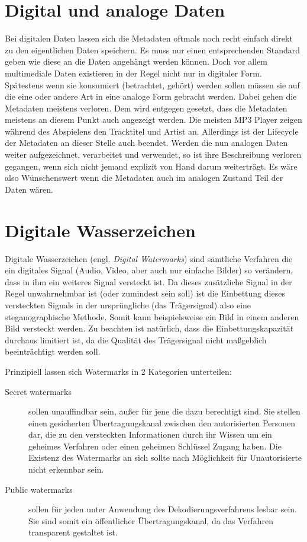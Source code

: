 \section{Digital und analoge Daten}

Bei digitalen Daten lassen sich die Metadaten oftmals noch recht einfach direkt zu den eigentlichen Daten speichern. Es muss nur einen entsprechenden Standard geben wie diese an die Daten angehängt werden können. Doch vor allem multimediale Daten existieren in der Regel nicht nur in digitaler Form. Spätestens wenn sie konsumiert (betrachtet, gehört) werden sollen müssen sie auf die eine oder andere Art in eine analoge Form gebracht werden. Dabei gehen die Metadaten meistens verloren. Dem wird entgegen gesetzt, dass die Metadaten meistens an diesem Punkt auch angezeigt werden. Die meisten MP3 Player zeigen während des Abspielens den Tracktitel und Artist an. Allerdings ist der Lifecycle der Metadaten an dieser Stelle auch beendet. Werden die nun analogen Daten weiter aufgezeichnet, verarbeitet und verwendet, so ist ihre Beschreibung verloren gegangen, wenn sich nicht jemand explizit \glqq{}von Hand\grqq{} darum weiterträgt. Es wäre also Wünschenswert wenn die Metadaten auch im analogen Zustand Teil der Daten wären. 

\section{Digitale Wasserzeichen}

Digitale Wasserzeichen (engl. \textit{Digital Watermarks}) sind sämtliche Verfahren die ein digitales Signal (Audio, Video, aber auch nur einfache Bilder) so verändern, dass in ihm ein weiteres Signal versteckt ist. Da dieses zusätzliche Signal in der Regel unwahrnehmbar ist (oder zumindest sein soll) ist die Einbettung dieses \glqq{}versteckten Signals\grqq{} in der ursprüngliche (das \glqq{}Trägersignal\grqq{}) also eine steganographische Methode.
Somit kann beispielsweise ein Bild in einem anderen Bild versteckt werden. Zu beachten ist natürlich, dass die Einbettungskapazität durchaus limitiert ist, da die Qualität des Trägersignal nicht maßgeblich beeinträchtigt werden soll. 

Prinzipiell lassen sich Watermarks in 2 Kategorien unterteilen\cite{arnold2000audio}: 

\begin{description}
	
	\item[Secret watermarks] sollen unauffindbar sein, außer für jene die dazu berechtigt sind. Sie stellen einen gesicherten Übertragungskanal zwischen den autorisierten Personen dar, die zu den versteckten Informationen durch ihr Wissen um ein geheimes Verfahren oder einen geheimen Schlüssel Zugang haben. Die Existenz des Watermarks an sich sollte nach Möglichkeit für Unautorisierte nicht erkennbar sein. 
	
	\item[Public watermarks] sollen für jeden unter Anwendung des Dekodierungsverfahrens lesbar sein. Sie sind somit ein öffentlicher Übertragungskanal, da das Verfahren transparent gestaltet ist.
	
\end{description}

